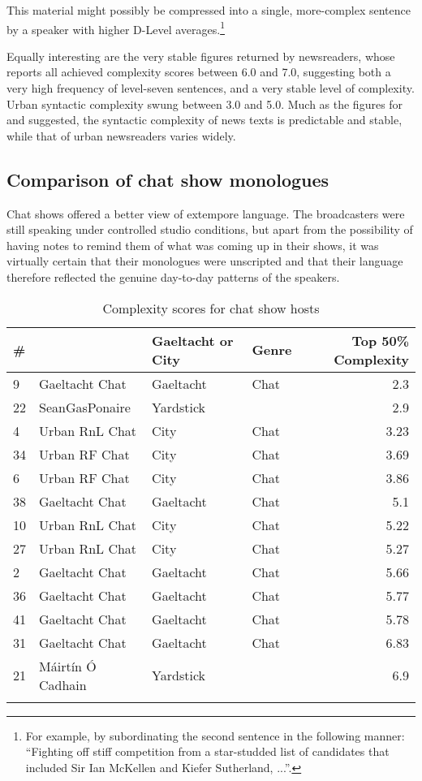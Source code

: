 \documentclass[output=paper,colorlinks,citecolor=brown]{langscibook}
\begin{document}
This material might possibly be compressed into a single, more-complex sentence by a speaker with higher D-Level averages.\footnote{For example, by subordinating the second sentence in the following manner: “Fighting off stiff competition from a star-studded list of candidates that included Sir Ian McKellen and Kiefer Sutherland, ...”.}

Equally interesting are the very stable figures returned by  newsreaders, whose reports all achieved complexity scores between 6.0 and 7.0, suggesting both a very high frequency of level-seven sentences, and a very stable level of complexity. Urban syntactic complexity swung between 3.0 and 5.0. Much as the figures for  and  suggested, the syntactic complexity of  news texts is predictable and stable, while that of urban newsreaders varies widely.

\subsection{Comparison of chat show monologues}

Chat shows offered a better view of extempore language. The broadcasters were still speaking under controlled studio conditions, but apart from the possibility of having notes to remind them of what was coming up in their shows, it was virtually certain that their monologues were unscripted and that their language therefore reflected the genuine day-to-day patterns of the speakers.
 
\begin{table}
\small
\begin{tabular}{llllr}
\lsptoprule
\#  &                      & Gaeltacht or City & Genre & Top 50\% Complexity \\
\midrule
9  & Gaeltacht Chat   & Gaeltacht & Chat & 2.3 \\
22 & SeanGasPonaire       & Yardstick &      & 2.9 \\
4  & Urban RnL Chat       & City      & Chat & 3.23 \\
34 & Urban RF Chat        & City      & Chat & 3.69 \\
6  & Urban RF Chat        & City      & Chat & 3.86 \\
\midrule
38 & Gaeltacht Chat    & Gaeltacht & Chat & 5.1 \\
10 & Urban RnL Chat       & City      & Chat & 5.22 \\
27 & Urban RnL Chat       & City      & Chat & 5.27 \\
\midrule
2  & Gaeltacht Chat   & Gaeltacht & Chat & 5.66 \\
36 & Gaeltacht Chat  & Gaeltacht & Chat & 5.77 \\
41 & Gaeltacht Chat       & Gaeltacht & Chat & 5.78 \\
31 & Gaeltacht Chat    & Gaeltacht & Chat & 6.83 \\
21 & Máirtín Ó Cadhain    & Yardstick &      & 6.9 \\
\lspbottomrule
\end{tabular}
\caption{Complexity scores for chat show hosts}
\label{fig:OBroin:4}
\end{table}
\end{document}
